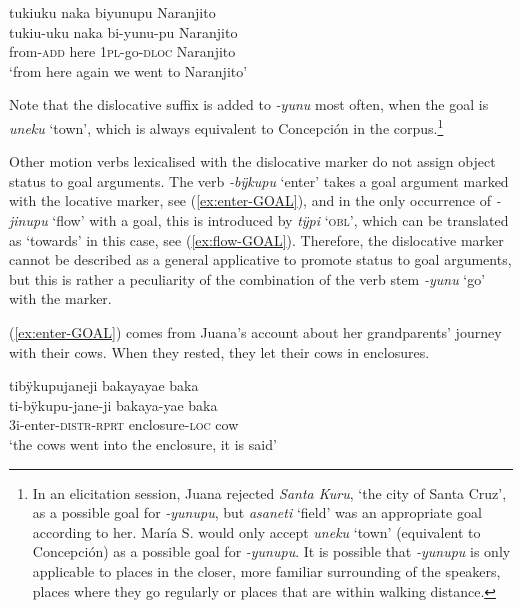 \ea\label{ex:yunupu-2}
\begingl 
\glpreamble tukiuku naka biyunupu Naranjito\\
\gla tukiu-uku naka bi-yunu-pu Naranjito\\ 
\glb from-\textsc{add} here 1\textsc{pl}-go-\textsc{dloc} Naranjito\\ 
\glft ‘from here again we went to Naranjito’\\ 
\endgl
\trailingcitation{[mxx-p110825l.181]}
\xe

Note that the dislocative suffix is added to \textit{-yunu} most often, when the goal is \textit{uneku} ‘town’, which is always equivalent to Concepción in the corpus.\footnote{In an elicitation session, Juana rejected \textit{Santa Kuru}, ‘the city of Santa Cruz’, as a possible goal for \textit{-yunupu}, but \textit{asaneti} ‘field’ was an appropriate goal according to her. María S. would only accept \textit{uneku} ‘town’ (equivalent to Concepción) as a possible goal for \textit{-yunupu}. It is possible that \textit{-yunupu} is only applicable to places in the closer, more familiar surrounding of the speakers, places where they go regularly or places that are within walking distance.}

Other motion verbs lexicalised with the dislocative marker do not assign object status to goal arguments. The verb \textit{-bÿkupu} ‘enter’ takes a goal argument marked with the locative marker, see (\ref{ex:enter-GOAL}), and in the only occurrence of \textit{-jinupu} ‘flow’ with a goal, this is introduced by \textit{tÿpi} ‘\textsc{obl}’, which can be translated as ‘towards’ in this case, see (\ref{ex:flow-GOAL}). Therefore, the dislocative marker cannot be described as a general applicative to promote  status to goal arguments, but this is rather a peculiarity of the combination of the verb stem \textit{-yunu} ‘go’ with the marker.

(\ref{ex:enter-GOAL}) comes from Juana’s account about her grandparents’ journey with their cows. When they rested, they let their cows in enclosures.

\ea\label{ex:enter-GOAL}
\begingl 
\glpreamble tibÿkupujaneji bakayayae baka\\
\gla ti-bÿkupu-jane-ji bakaya-yae baka \\ 
\glb 3i-enter-\textsc{distr}-\textsc{rprt} enclosure-\textsc{loc} cow\\ 
\glft ‘the cows went into the enclosure, it is said’\\ 
\endgl
\trailingcitation{[jxx-p151016l-2]}
\xe

